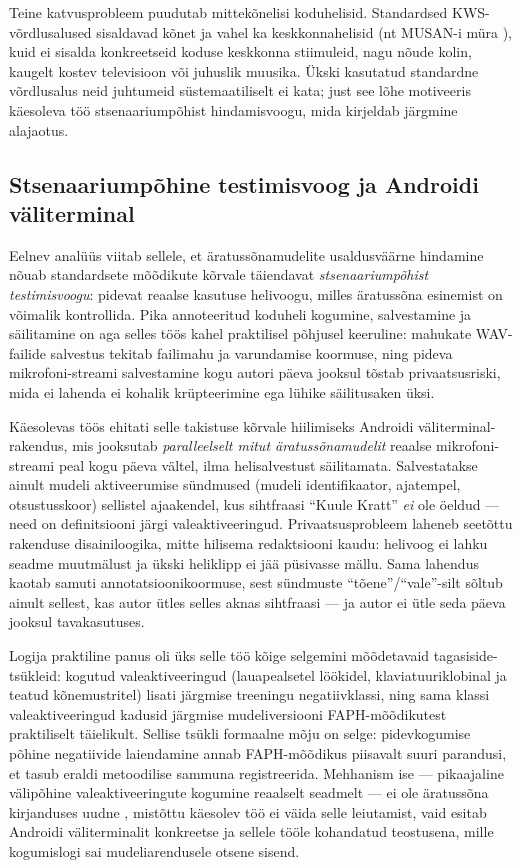 Teine katvusprobleem puudutab mittekõnelisi koduhelisid. Standardsed KWS-võrdlusalused sisaldavad kõnet ja vahel ka keskkonnahelisid (nt MUSAN-i müra \cite{musan2015}), kuid ei sisalda konkreetseid koduse keskkonna stiimuleid, nagu nõude kolin, kaugelt kostev televisioon või juhuslik muusika. Ükski kasutatud standardne võrdlusalus neid juhtumeid süstemaatiliselt ei kata; just see lõhe motiveeris käesoleva töö stsenaariumpõhist hindamisvoogu, mida kirjeldab järgmine alajaotus.

\subsection{Stsenaariumpõhine testimisvoog ja Androidi väliterminal}
\label{sec:android-logger}

Eelnev analüüs viitab sellele, et äratussõnamudelite usaldusväärne hindamine nõuab standardsete mõõdikute kõrvale täiendavat \emph{stsenaariumpõhist testimisvoogu}: pidevat reaalse kasutuse helivoogu, milles äratussõna esinemist on võimalik kontrollida. Pika annoteeritud koduheli kogumine, salvestamine ja säilitamine on aga selles töös kahel praktilisel põhjusel keeruline: mahukate WAV-failide salvestus tekitab failimahu ja varundamise koormuse, ning pideva mikrofoni-streami salvestamine kogu autori päeva jooksul tõstab privaatsusriski, mida ei lahenda ei kohalik krüpteerimine ega lühike säilitusaken üksi.

Käesolevas töös ehitati selle takistuse kõrvale hiilimiseks Androidi väliterminal-rakendus, mis jooksutab \emph{paralleelselt mitut äratussõnamudelit} reaalse mikrofoni-streami peal kogu päeva vältel, ilma helisalvestust säilitamata. Salvestatakse ainult mudeli aktiveerumise sündmused (mudeli identifikaator, ajatempel, otsustusskoor) sellistel ajaakendel, kus sihtfraasi \enquote{Kuule Kratt} \emph{ei} ole öeldud --- need on definitsiooni järgi valeaktiveeringud. Privaatsusprobleem laheneb seetõttu rakenduse disainiloogika, mitte hilisema redaktsiooni kaudu: helivoog ei lahku seadme muutmälust ja ükski heliklipp ei jää püsivasse mällu. Sama lahendus kaotab samuti annotatsioonikoormuse, sest sündmuste \enquote{tõene}/\enquote{vale}-silt sõltub ainult sellest, kas autor ütles selles aknas sihtfraasi --- ja autor ei ütle seda päeva jooksul tavakasutuses.

Logija praktiline panus oli üks selle töö kõige selgemini mõõdetavaid tagasiside-tsükleid: kogutud valeaktiveeringud (lauapealsetel löökidel, klaviatuuriklobinal ja teatud kõnemustritel) lisati järgmise treeningu negatiivklassi, ning sama klassi valeaktiveeringud kadusid järgmise mudeliversiooni FAPH-mõõdikutest praktiliselt täielikult. Sellise tsükli formaalne mõju on selge: pidevkogumise põhine negatiivide laiendamine annab FAPH-mõõdikus piisavalt suuri parandusi, et tasub eraldi metoodilise sammuna registreerida. Mehhanism ise --- pikaajaline välipõhine valeaktiveeringute kogumine reaalselt seadmelt --- ei ole äratussõna kirjanduses uudne \cite{apple-heysiri2017,sigtia2020multitask}, mistõttu käesolev töö ei väida selle leiutamist, vaid esitab Androidi väliterminalit konkreetse ja sellele tööle kohandatud teostusena, mille kogumislogi sai mudeliarendusele otsene sisend.


